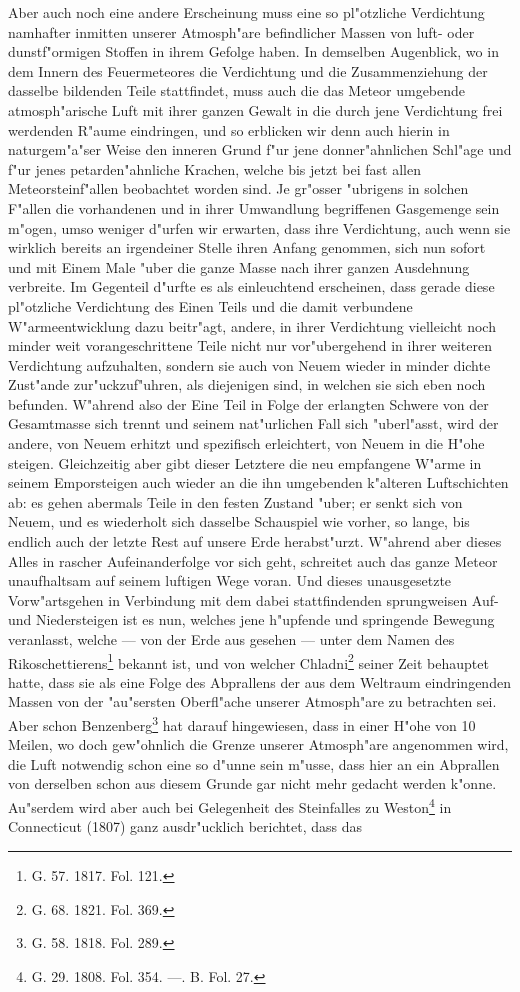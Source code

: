 \documentclass[a4paper, 8pt, oneside, polutonikogreek, german]{article}
\begin{document}
Aber auch noch eine andere Erscheinung muss eine so pl"otzliche Verdichtung namhafter inmitten unserer Atmosph"are befindlicher Massen von luft- oder dunstf"ormigen Stoffen in ihrem Gefolge haben. In demselben Augenblick, wo in dem Innern des Feuermeteores die Verdichtung und die Zusammenziehung der dasselbe bildenden Teile stattfindet, muss auch die das Meteor umgebende atmosph"arische Luft mit ihrer ganzen Gewalt in die durch jene Verdichtung frei werdenden R"aume eindringen, und so erblicken wir denn auch hierin in naturgem"a"ser Weise den inneren Grund f"ur jene donner"ahnlichen Schl"age und f"ur jenes petarden"ahnliche Krachen, welche bis jetzt bei fast allen Meteorsteinf"allen beobachtet worden sind. Je gr"osser "ubrigens in solchen F"allen die vorhandenen und in ihrer Umwandlung begriffenen Gasgemenge sein m"ogen, umso weniger d"urfen wir erwarten, dass ihre Verdichtung, auch wenn sie wirklich bereits an irgendeiner Stelle ihren Anfang genommen, sich nun sofort und mit Einem Male "uber die ganze Masse nach ihrer ganzen Ausdehnung verbreite. Im Gegenteil d"urfte es als einleuchtend erscheinen, dass gerade diese pl"otzliche Verdichtung des Einen Teils und die damit verbundene W"armeentwicklung dazu beitr"agt, andere, in ihrer Verdichtung vielleicht noch minder weit vorangeschrittene Teile nicht nur vor"ubergehend in ihrer weiteren Verdichtung aufzuhalten, sondern sie auch von Neuem wieder in minder dichte Zust"ande zur"uckzuf"uhren, als diejenigen sind, in welchen sie sich eben noch befunden. W"ahrend also der Eine Teil in Folge der erlangten Schwere von der Gesamtmasse sich trennt und seinem nat"urlichen Fall sich "uberl"asst, wird der andere, von Neuem erhitzt und spezifisch erleichtert, von Neuem in die H"ohe steigen. Gleichzeitig aber gibt dieser Letztere die neu empfangene W"arme in seinem Emporsteigen auch wieder an die ihn umgebenden k"alteren Luftschichten ab: es gehen abermals Teile in den festen Zustand "uber; er senkt sich von Neuem, und es wiederholt sich dasselbe Schauspiel wie vorher, so lange, bis endlich auch der letzte Rest auf unsere Erde herabst"urzt. W"ahrend aber dieses Alles in rascher Aufeinanderfolge vor sich geht, schreitet auch das ganze Meteor unaufhaltsam auf seinem luftigen Wege voran. Und dieses unausgesetzte Vorw"artsgehen in Verbindung mit dem dabei stattfindenden sprungweisen Auf- und Niedersteigen ist es nun, welches jene h"upfende und springende Bewegung veranlasst, welche --- von der Erde aus gesehen --- unter dem Namen des Rikoschettierens\footnote{G. 57. 1817. Fol. 121.} bekannt ist, und von welcher Chladni\footnote{G. 68. 1821. Fol. 369.} seiner Zeit behauptet hatte, dass sie als eine Folge des Abprallens der aus dem Weltraum eindringenden Massen von der "au"sersten Oberfl"ache unserer Atmosph"are zu betrachten sei. Aber schon Benzenberg\footnote{G. 58. 1818. Fol. 289.} hat darauf hingewiesen, dass in einer H"ohe von 10 Meilen, wo doch gew"ohnlich die Grenze unserer Atmosph"are angenommen wird, die Luft notwendig schon eine so d"unne sein m"usse, dass hier an ein Abprallen von derselben schon aus diesem Grunde gar nicht mehr gedacht werden k"onne. Au"serdem wird aber auch bei Gelegenheit des Steinfalles zu Weston\footnote{G. 29. 1808. Fol. 354. ---. B. Fol. 27.} in Connecticut (1807) ganz ausdr"ucklich berichtet, dass das 
\end{document}
